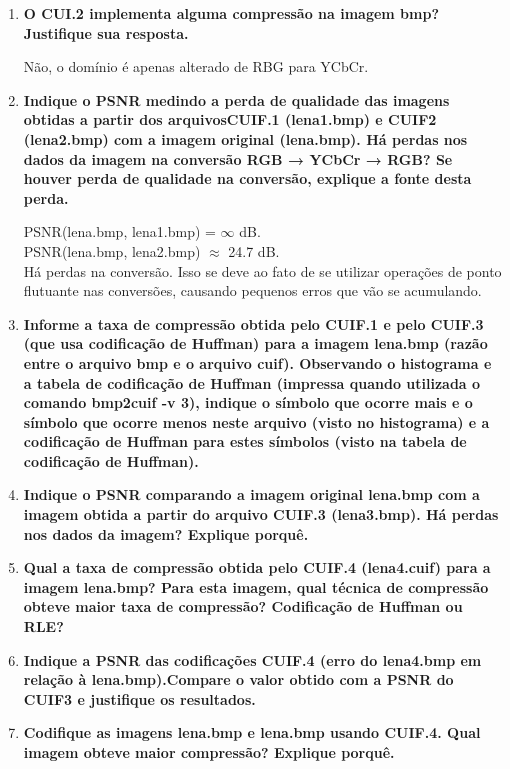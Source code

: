 \documentclass[12pt, a4paper, oneside]{abntex2}
\begin{document}
    \printcoverufsc

    \begin{enumerate}
        \item \textbf{O CUI.2 implementa alguma compressão na imagem bmp?
                Justifique sua resposta.}

                Não, o domínio é apenas alterado de RBG para YCbCr.

        \item \textbf{Indique o PSNR medindo a perda de qualidade das imagens obtidas a partir dos arquivosCUIF.1 (lena1.bmp) e CUIF2 (lena2.bmp) com a imagem original (lena.bmp).
        Há perdas nos dados da imagem na conversão RGB → YCbCr → RGB? Se houver perda de qualidade na conversão, explique a fonte desta perda.}

                PSNR(lena.bmp, lena1.bmp) = $\infty$ dB. \\
                PSNR(lena.bmp, lena2.bmp) $\approx$ 24.7 dB. \\
                Há perdas na conversão.
                Isso se deve ao fato de se utilizar operações de ponto flutuante nas conversões, causando pequenos erros que vão se acumulando.

        \item \textbf{Informe a taxa de compressão obtida pelo CUIF.1 e pelo CUIF.3 (que usa codificação de Huffman) para a imagem lena.bmp (razão entre o arquivo bmp e o arquivo cuif).
        Observando o histograma e a tabela de codificação de Huffman (impressa quando utilizada o comando bmp2cuif -v 3), indique o símbolo que ocorre mais e o símbolo que ocorre menos neste arquivo (visto no histograma) e a codificação de Huffman para estes símbolos (visto na tabela de codificação de Huffman).}

        \item \textbf{Indique o PSNR comparando a imagem original lena.bmp com a imagem obtida a partir do arquivo CUIF.3 (lena3.bmp).
        Há perdas nos dados da imagem?
        Explique porquê.}

        \item \textbf{Qual a taxa de compressão obtida pelo CUIF.4 (lena4.cuif) para a imagem lena.bmp?
        Para esta imagem, qual técnica de compressão obteve maior taxa de compressão?
        Codificação de Huffman ou RLE?}

        \item \textbf{Indique a PSNR das codificações CUIF.4 (erro do lena4.bmp em relação à lena.bmp).Compare o valor obtido com a PSNR do CUIF3 e justifique os resultados.}

        \item \textbf{Codifique as imagens lena.bmp e lena.bmp usando CUIF.4. Qual imagem obteve maior compressão?
        Explique porquê.}


    \end{enumerate}
\end{document}
